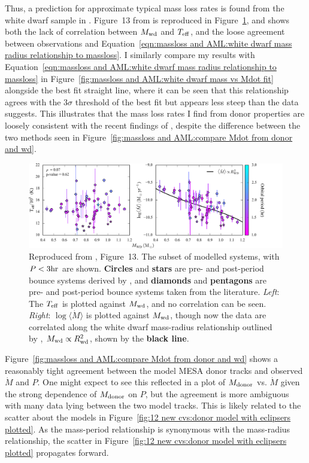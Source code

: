 Thus, a prediction for approximate typical mass loss rates is found from the white dwarf sample in \citet{Pala2021}. Figure~13 from \citep{Pala2021} is reproduced in Figure~\ref{fig:modelling:pala2022 fig13}, and shows both the lack of correlation between $M_{\rm wd}$ and $T_{\rm eff}$, and the loose agreement between observations and Equation~\ref{eqn:massloss and AML:white dwarf mass radius relationship to massloss}.
I similarly compare my results with Equation~\ref{eqn:massloss and AML:white dwarf mass radius relationship to massloss} in Figure~\ref{fig:massloss and AML:white dwarf mass vs Mdot fit} alongside the best fit straight line, where it can be seen that this relationship agrees with the $3\sigma$ threshold of the best fit but appears less steep than the data suggests.
This illustrates that the mass loss rates I find from donor properties are loosely consistent with the recent findings of \citet{Pala2021}, despite the difference between the two methods seen in Figure~\ref{fig:massloss and AML:compare Mdot from donor and wd}.
\begin{figure}
    \centering
    \includegraphics[width=\textwidth]{figures/modelling/pala_2022_fig13.png}
    \caption{Reproduced from \citet{Pala2021}, Figure~13. The subset of modelled systems, with $P < 3{\rm hr}$ are shown. {\bf Circles} and {\bf stars} are pre- and post-period bounce systems derived by \citet{Pala2021}, and {\bf diamonds} and {\bf pentagons} are pre- and post-period bounce systems taken from the literature. {\it Left}: The $T_{\rm eff}$ is plotted against $M_{\rm wd}$, and no correlation can be seen. {\it Right}: $\log \langle \dot M \rangle$ is plotted against $M_{\rm wd}$, though now the data are correlated along the white dwarf mass-radius relationship outlined by \citet{Pala2021}, $M_{\rm wd} \propto R_{\rm wd}^{2}$, shown by the {\bf black line}.}
    \label{fig:modelling:pala2022 fig13}
\end{figure}

Figure~\ref{fig:massloss and AML:compare Mdot from donor and wd} shows a reasonably tight agreement between the model MESA donor tracks and observed $\dot M$ and $P$.
One might expect to see this reflected in a plot of $M_{\rm donor}$ vs. $\dot M$ given the strong dependence of $M_{\rm donor}$ on $P$, but the agreement is more ambiguous with many data lying between the two model tracks.
This is likely related to the scatter about the models in Figure~\ref{fig:12 new cvs:donor model with eclipsers plotted}. As the mass-period relationship is synonymous with the mass-radius relationship, the scatter in Figure~\ref{fig:12 new cvs:donor model with eclipsers plotted} propagates forward.

